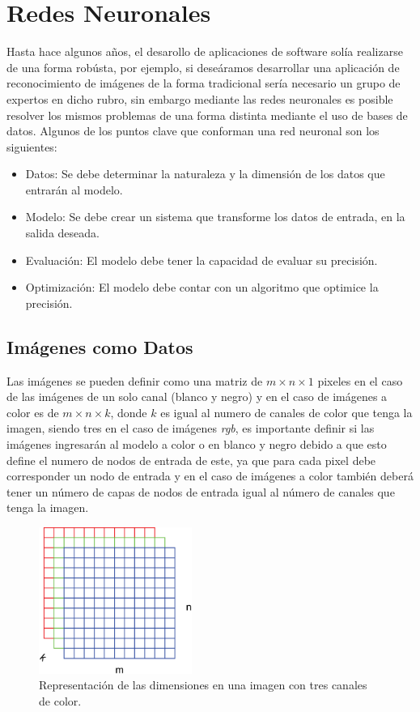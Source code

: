 
\section{Redes Neuronales}

Hasta hace algunos años, el desarollo de aplicaciones de software solía realizarse de una forma robústa, por ejemplo, si deseáramos desarrollar una aplicación de reconocimiento de imágenes de la forma tradicional sería necesario un grupo de expertos en dicho rubro, sin embargo mediante las redes neuronales es posible resolver los mismos problemas de una forma distinta mediante el uso de bases de datos. Algunos de los puntos clave que conforman una red neuronal son los siguientes:

\begin{itemize}
    \item Datos: Se debe determinar la naturaleza y la dimensión de los datos que entrarán al modelo.
    \item Modelo: Se debe crear un sistema que transforme los datos de entrada, en la salida deseada.
    \item Evaluación: El modelo debe tener la capacidad de evaluar su precisión.
    \item Optimización: El modelo debe contar con un algoritmo que optimice la precisión.
\end{itemize}

\subsection{Imágenes como Datos}
Las imágenes se pueden definir como una matriz de $m \times n \times 1$ pixeles en el caso de las imágenes de un solo canal (blanco y negro) y en el caso de imágenes a color es de $m \times n \times k$, donde $k$ es igual al numero de canales de color que tenga la imagen, siendo tres en el caso de imágenes \emph{rgb}, es importante definir si las imágenes ingresarán al modelo a color o en blanco y negro debido a que esto define el numero de nodos de entrada de este, ya que para cada pixel debe corresponder un nodo de entrada y en el caso de imágenes a color también deberá tener un número de capas de nodos de entrada igual al número de canales que tenga la imagen.

\begin{figure}[h!]
    \includegraphics[width=50mm]{Figuras/rgb_matrix_2.eps}
    \centering
    \caption{Representación de las dimensiones en una imagen con tres canales de color.}
    \label{fig:rgb_mat}
\end{figure}


